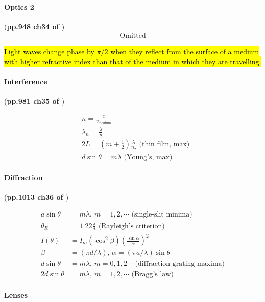 \documentclass{article}
\numberwithin{equation}{subsection} %
\theoremstyle{definition}
\begin{document}
\paragraph{Optics 2} (\textbf{pp.948 ch34 of \cite{book}})
\begin{align}
    \text{Omitted}
\end{align}

\hl{Light waves change phase by $\pi/2$ when they reflect from the surface of
a medium with higher refractive index than that of the medium in which
they are travelling.}

\paragraph{Interference} (\textbf{pp.981 ch35 of \cite{book}})

\begin{align}
    & n = \frac{c}{v_\text{medium}} \\
    & \lambda_n = \frac{\lambda}{n} \\
    & 2L = (m+\frac{1}{2})\frac{\lambda}{n_2} \text{ (thin film, max)}
    \\
    & d\sin{\theta} = m\lambda \text{ (Young's, max)}
\end{align}

\paragraph{Diffraction} (\textbf{pp.1013 ch36 of \cite{book}})

\begin{align}
    a\sin{\theta} &= m \lambda \text{, $m=1,2,\cdots$ (single-slit
    minima)} \\
    \theta_R &= 1.22\frac{\lambda}{d} \text{ (Rayleigh's criterion)}
    \\
    I(\theta) &=  I_m
      (\cos^2\beta)\left(\frac{\sin{\alpha}}{\alpha}\right)^2 \\
    \beta &= (\pi d/\lambda),\, \alpha = (\pi a/\lambda)\sin\theta \\
    d\sin{\theta} &= m\lambda \text{, $m=0,1,2\cdots$ (diffraction
      grating maxima)} \\
    2d\sin{\theta} &= m\lambda \text{, $m=1,2,\cdots$ (Bragg's law)}
\end{align}

\paragraph{Lenses}
\end{document}
